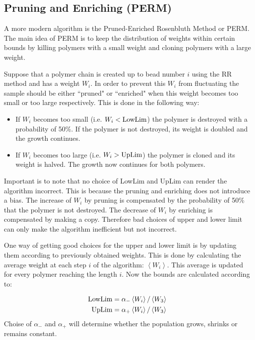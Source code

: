 \subsection*{Pruning and Enriching (PERM)}
A more modern algorithm is the Pruned-Enriched Rosenbluth Method or PERM. The main idea of PERM is to keep the distribution of weights within certain bounds by killing polymers with a small weight and cloning polymers with a large weight.

Suppose that a polymer chain is created up to bead number $i$ using the RR method and has a weight $W_i$. In order to prevent this $W_i$ from fluctuating the sample should be either ``pruned" or ``enriched" when this weight becomes too small or too large respectively. This is done in the following way:

\begin{itemize}
  \item If $W_i$ becomes too small (i.e. $W_i < \textup{LowLim}$) the polymer is destroyed with a probability of 50\%. If the polymer is not destroyed, its weight is doubled and the growth continues.
  \item If $W_i$ becomes too large (i.e. $W_i > \textup{UpLim}$) the polymer is cloned and its weight is halved. The growth now continues for both polymers.
\end{itemize}

Important is to note that no choice of LowLim and UpLim can render the algorithm incorrect. This is because the pruning and enriching does not introduce a bias. The increase of $W_i$ by pruning is compensated by the probability of 50\% that the polymer is not destroyed. The decrease of $W_i$ by enriching is compensated by making a copy. Therefore bad choices of upper and lower limit can only make the algorithm inefficient but not incorrect.

One way of getting good choices for the upper and lower limit is by updating them according to previously obtained weights. This is done by calculating the average weight at each step $i$ of the algorithm: $\left \langle W_i \right \rangle$. This average is updated for every polymer reaching the length $i$. Now the bounds are calculated according to:

\begin{equation} \label{eq:LowLim_UpLim}
\begin{aligned}
	\textup{LowLim} &= \alpha_- \left \langle W_i \right \rangle / \left \langle W_3 \right \rangle \\
	\textup{UpLim} &= \alpha_+ \left \langle W_i \right \rangle / \left \langle W_3 \right \rangle
\end{aligned}
\end{equation}
Choise of $\alpha_-$ and $\alpha_+$ will determine whether the population grows, shrinks or remains constant.


